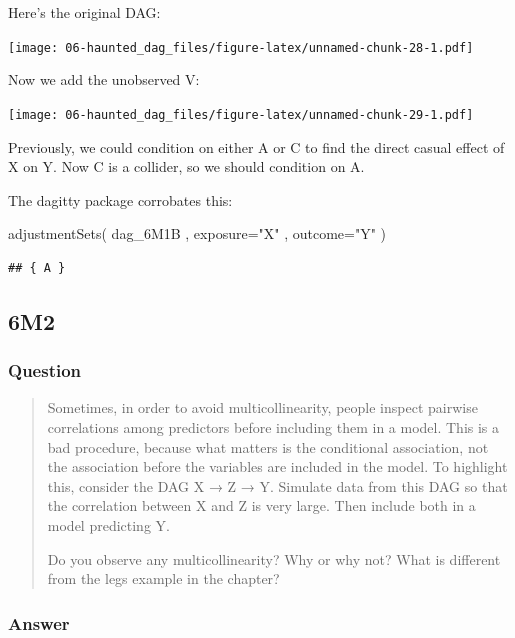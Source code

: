 \documentclass[
]{book}
\newenvironment{Shaded}{\begin{snugshade}}{\end{snugshade}}
\newcommand{\AttributeTok}[1]{\textcolor[rgb]{0.77,0.63,0.00}{#1}}
\newcommand{\FunctionTok}[1]{\textcolor[rgb]{0.00,0.00,0.00}{#1}}
\newcommand{\NormalTok}[1]{#1}
\newcommand{\StringTok}[1]{\textcolor[rgb]{0.31,0.60,0.02}{#1}}
\begin{document}
Here's the original DAG:

\texttt{[image: 06-haunted\_dag\_files/figure-latex/unnamed-chunk-28-1.pdf]}

Now we add the unobserved V:

\texttt{[image: 06-haunted\_dag\_files/figure-latex/unnamed-chunk-29-1.pdf]}

Previously, we could condition on either A or C to find the direct casual effect of X on Y. Now C is a collider, so we should condition on A.

The dagitty package corrobates this:

\begin{Shaded}
\begin{Highlighting}[]
\FunctionTok{adjustmentSets}\NormalTok{( dag\_6M1B , }\AttributeTok{exposure=}\StringTok{"X"}\NormalTok{ , }\AttributeTok{outcome=}\StringTok{"Y"}\NormalTok{ )}
\end{Highlighting}
\end{Shaded}

\begin{verbatim}
## { A }
\end{verbatim}

\hypertarget{m2-3}{%
\subsection*{6M2}\label{m2-3}}

\hypertarget{question-53}{%
\subsubsection*{Question}\label{question-53}}

\begin{quote}
Sometimes, in order to avoid multicollinearity, people inspect pairwise correlations among predictors before including them in a model. This is a bad procedure, because what matters is the conditional association, not the association before the variables are included in the model. To highlight this, consider the DAG X → Z → Y. Simulate data from this DAG so that the correlation between X and Z is very large. Then include both in a model predicting Y.

Do you observe any multicollinearity? Why or why not? What is different from the legs example in the chapter?
\end{quote}

\hypertarget{answer-53}{%
\subsubsection*{Answer}\label{answer-53}}
\end{document}
